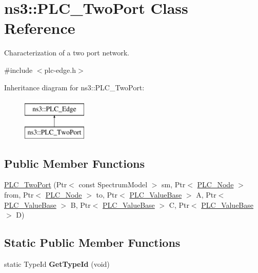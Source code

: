 \hypertarget{classns3_1_1PLC__TwoPort}{\section{ns3\-:\-:\-P\-L\-C\-\_\-\-Two\-Port \-Class \-Reference}
\label{classns3_1_1PLC__TwoPort}
}


\-Characterization of a two port network.  




{\ttfamily \#include $<$plc-\/edge.\-h$>$}

\-Inheritance diagram for ns3\-:\-:\-P\-L\-C\-\_\-\-Two\-Port\-:\begin{figure}[H]
\begin{center}
\leavevmode
\includegraphics[height=2.000000cm]{classns3_1_1PLC__TwoPort}
\end{center}
\end{figure}
\subsection*{\-Public \-Member \-Functions}
\begin{DoxyCompactItemize}
\item 
\hyperlink{classns3_1_1PLC__TwoPort_a6684e0b1a597e1cb5c8dff4fd8f00e6b}{\-P\-L\-C\-\_\-\-Two\-Port} (\-Ptr$<$ const \-Spectrum\-Model $>$ sm, \-Ptr$<$ \hyperlink{classns3_1_1PLC__Node}{\-P\-L\-C\-\_\-\-Node} $>$ from, \-Ptr$<$ \hyperlink{classns3_1_1PLC__Node}{\-P\-L\-C\-\_\-\-Node} $>$ to, \-Ptr$<$ \hyperlink{classns3_1_1PLC__ValueBase}{\-P\-L\-C\-\_\-\-Value\-Base} $>$ \-A, \-Ptr$<$ \hyperlink{classns3_1_1PLC__ValueBase}{\-P\-L\-C\-\_\-\-Value\-Base} $>$ \-B, \-Ptr$<$ \hyperlink{classns3_1_1PLC__ValueBase}{\-P\-L\-C\-\_\-\-Value\-Base} $>$ \-C, \-Ptr$<$ \hyperlink{classns3_1_1PLC__ValueBase}{\-P\-L\-C\-\_\-\-Value\-Base} $>$ \-D)
\end{DoxyCompactItemize}
\subsection*{\-Static \-Public \-Member \-Functions}
\begin{DoxyCompactItemize}
\item 
\hypertarget{classns3_1_1PLC__TwoPort_a3ea4c9fc7f48ffc8fb0bc50c7c9197eb}{static \-Type\-Id {\bfseries \-Get\-Type\-Id} (void)}\label{classns3_1_1PLC__TwoPort_a3ea4c9fc7f48ffc8fb0bc50c7c9197eb}

\end{DoxyCompactItemize}


